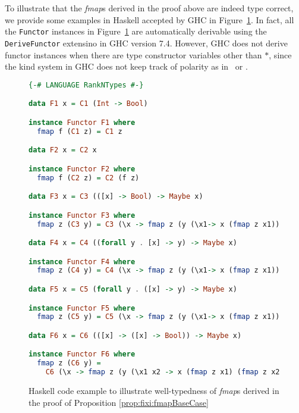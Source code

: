 To illustrate that the \textit{fmap}s derived in the proof above are indeed
type correct, we provide some examples in Haskell accepted by GHC in
Figure~\ref{fig:deriveFunctor}. In fact, all the \texttt{\small Functor}
instances in Figure~\ref{fig:deriveFunctor} are automatically derivable
using the \texttt{\small DeriveFunctor} extensino in GHC version 7.4.
However, GHC does not derive functor instances when there are
type constructor variables other than $*$, since the kind system in GHC
does not keep track of polarity as in \Fixw\ or \Fixi.
\begin{figure}
\begin{singlespace}
\begin{lstlisting}[basicstyle={\ttfamily\small},language=Haskell,mathescape]
{-# LANGUAGE RankNTypes #-}

data F1 x = C1 (Int -> Bool)

instance Functor F1 where
  fmap f (C1 z) = C1 z

data F2 x = C2 x

instance Functor F2 where
  fmap f (C2 z) = C2 (f z)

data F3 x = C3 (([x] -> Bool) -> Maybe x)

instance Functor F3 where
  fmap z (C3 y) = C3 (\x -> fmap z (y (\x1-> x (fmap z x1))))

data F4 x = C4 ((forall y . [x] -> y) -> Maybe x)

instance Functor F4 where
  fmap z (C4 y) = C4 (\x -> fmap z (y (\x1-> x (fmap z x1))))

data F5 x = C5 (forall y . ([x] -> y) -> Maybe x)

instance Functor F5 where
  fmap z (C5 y) = C5 (\x -> fmap z (y (\x1-> x (fmap z x1))))

data F6 x = C6 (([x] -> ([x] -> Bool)) -> Maybe x)

instance Functor F6 where
  fmap z (C6 y) =
    C6 (\x -> fmap z (y (\x1 x2 -> x (fmap z x1) (fmap z x2))))
\end{lstlisting}
\end{singlespace}
\caption{Haskell code example to illustrate well-typedness of \textit{fmap}s
        derived in the proof of Proposition \ref{prop:fixi:fmapBaseCase}}
\label{fig:deriveFunctor}
\end{figure}

